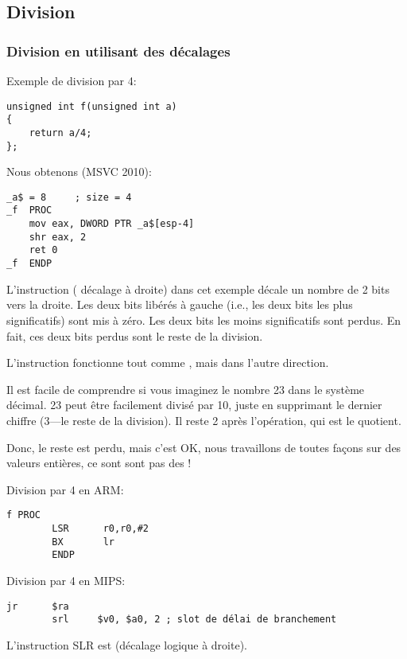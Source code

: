 ﻿\subsection{Division}

\subsubsection{Division en utilisant des décalages}
\label{division_by_shifting}

Exemple de division par 4:

\begin{lstlisting}[style=customc]
unsigned int f(unsigned int a)
{
	return a/4;
};
\end{lstlisting}

Nous obtenons (MSVC 2010):

\begin{lstlisting}[caption=MSVC 2010,style=customasmx86]
_a$ = 8		; size = 4
_f	PROC
	mov	eax, DWORD PTR _a$[esp-4]
	shr	eax, 2
	ret	0
_f	ENDP
\end{lstlisting}

\label{SHR}

L'instruction \SHR ( décalage à droite) dans cet exemple décale un
nombre de 2 bits vers la droite.
Les deux bits libérés à gauche (i.e., les deux bits les plus significatifs) sont
mis à zéro.
Les deux bits les moins significatifs sont perdus.
En fait, ces deux bits perdus sont le reste de la division.


L'instruction \SHR fonctionne tout comme \SHL, mais dans l'autre direction.



Il est facile de comprendre si vous imaginez le nombre 23 dans le système décimal.
23 peut être facilement divisé par 10, juste en supprimant le dernier chiffre (3---le
reste de la division).
Il reste 2 après l'opération, qui est le \gls{quotient}.

Donc, le reste est perdu, mais c'est OK, nous travaillons de toutes façons sur des
valeurs entières, ce sont sont pas des !

Division par 4 en ARM:

\begin{lstlisting}[caption=\NonOptimizingKeilVI (\ARMMode),style=customasmARM]
f PROC
        LSR      r0,r0,#2
        BX       lr
        ENDP
\end{lstlisting}

Division par 4 en MIPS:

\begin{lstlisting}[caption=GCC 4.4.5 \Optimizing (IDA),style=customasmMIPS]
        jr      $ra
        srl     $v0, $a0, 2 ; slot de délai de branchement
\end{lstlisting}

L'instruction SLR est  (décalage logique à droite).

